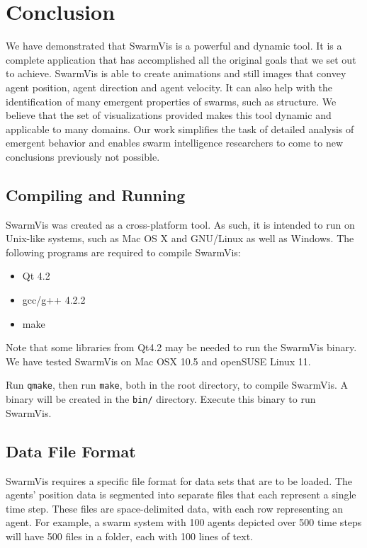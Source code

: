 \documentclass[conference]{IEEEtran}
\begin{document}
\section{Conclusion}
We have demonstrated that SwarmVis is a powerful and dynamic tool.
It is a complete application that has accomplished all the original goals that we set out to achieve.
SwarmVis is able to create animations and still images that convey agent position, agent direction and agent velocity.
It can also help with the identification of many emergent properties of swarms, such as structure.
We believe that the set of visualizations provided makes this tool dynamic and applicable to many domains.
Our work simplifies the task of detailed analysis of emergent behavior and
enables swarm intelligence researchers to come to new conclusions previously not possible.




\vspace{50pt}


\pagebreak


\subsection{Compiling and Running}
SwarmVis was created as a cross-platform tool. As such, it is intended to run on Unix-like systems, such as Mac OS X and GNU/Linux as well as Windows.
The following programs are required to compile SwarmVis:
\begin{itemize}
\item Qt 4.2
\item gcc/g++ 4.2.2
\item make
\end{itemize}
Note that some libraries from Qt4.2 may be needed to run the SwarmVis binary.
We have tested SwarmVis on Mac OSX 10.5 and openSUSE Linux 11.

Run \texttt{qmake}, then run \texttt{make}, both in the root directory, to compile SwarmVis.
A binary will be created in the \texttt{bin/} directory. Execute this binary to run SwarmVis.

\subsection{Data File Format}
SwarmVis requires a specific file format for data sets that are to be loaded. The agents' position data is segmented into
separate files that each represent a single time step. These files are space-delimited data, with
each row representing an agent. For example, a swarm system with 100 agents depicted over 500 time steps
will have 500 files in a folder, each with 100 lines of text.
\end{document}
